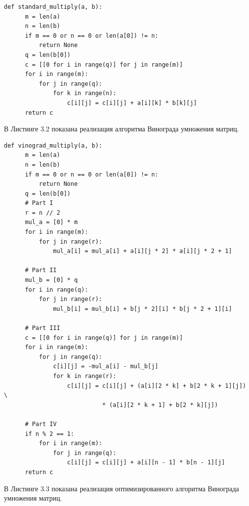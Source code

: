 \documentclass[a4paper,12pt]{report}
\begin{document}
\begin{lstlisting}[caption=Функция стандартного умножения матриц]
  def standard_multiply(a, b):
      m = len(a)
      n = len(b)
      if m == 0 or n == 0 or len(a[0]) != n:
          return None
      q = len(b[0])
      c = [[0 for i in range(q)] for j in range(m)]
      for i in range(m):
          for j in range(q):
              for k in range(n):
                  c[i][j] = c[i][j] + a[i][k] * b[k][j]
      return c
\end{lstlisting}
\newpage
В Листинге 3.2 показана реализация алгоритма Винограда умножения матриц.
\begin{lstlisting}[caption=Функция умножения матриц алгоритмом Винограда]
  def vinograd_multiply(a, b):
      m = len(a)
      n = len(b)
      if m == 0 or n == 0 or len(a[0]) != n:
          return None
      q = len(b[0])
      # Part I
      r = n // 2
      mul_a = [0] * m
      for i in range(m):
          for j in range(r):
              mul_a[i] = mul_a[i] + a[i][j * 2] * a[i][j * 2 + 1]

      # Part II
      mul_b = [0] * q
      for i in range(q):
          for j in range(r):
              mul_b[i] = mul_b[i] + b[j * 2][i] * b[j * 2 + 1][i]

      # Part III
      c = [[0 for i in range(q)] for j in range(m)]
      for i in range(m):
          for j in range(q):
              c[i][j] = -mul_a[i] - mul_b[j]
              for k in range(r):
                  c[i][j] = c[i][j] + (a[i][2 * k] + b[2 * k + 1][j]) \
                            * (a[i][2 * k + 1] + b[2 * k][j])

      # Part IV
      if n % 2 == 1:
          for i in range(m):
              for j in range(q):
                  c[i][j] = c[i][j] + a[i][n - 1] * b[n - 1][j]
      return c
\end{lstlisting}
\newpage
В Листинге 3.3 показана реализация оптимизированного алгоритма Винограда умножения матриц.
\end{document}
